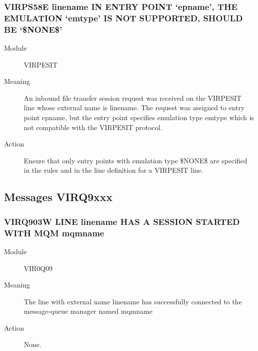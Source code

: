 \documentclass[letterpaper,10pt,english]{sphinxmanual}
\begin{document}
\subsubsection{VIRPS58E linename IN ENTRY POINT ‘epname’, THE EMULATION ‘emtype’ IS NOT SUPPORTED, SHOULD BE ‘\$NONE\$’}
\label{\detokenize{messages:virps58e-linename-in-entry-point-epname-the-emulation-emtype-is-not-supported-should-be-none}}\begin{description}
\item[{Module}] \leavevmode
VIRPESIT

\item[{Meaning}] \leavevmode
An inbound file transfer session request was received on the VIRPESIT line whose external name is linename. The request was assigned to entry point epname, but the entry point specifies emulation type emtype which is not compatible with the VIRPESIT protocol.

\item[{Action}] \leavevmode
Ensure that only entry points with emulation type \$NONE\$ are specified in the rules and in the line definition for a VIRPESIT line.

\end{description}


\subsection{Messages VIRQ9xxx}
\label{\detokenize{messages:messages-virq9xxx}}

\subsubsection{VIRQ903W LINE linename HAS A SESSION STARTED WITH MQM mqmname}
\label{\detokenize{messages:virq903w-line-linename-has-a-session-started-with-mqm-mqmname}}\begin{description}
\item[{Module}] \leavevmode
VIR0Q09

\item[{Meaning}] \leavevmode
The line with external name linename has successfully connected to the message-queue manager named mqmname

\item[{Action}] \leavevmode
None.

\end{description}
\end{document}
